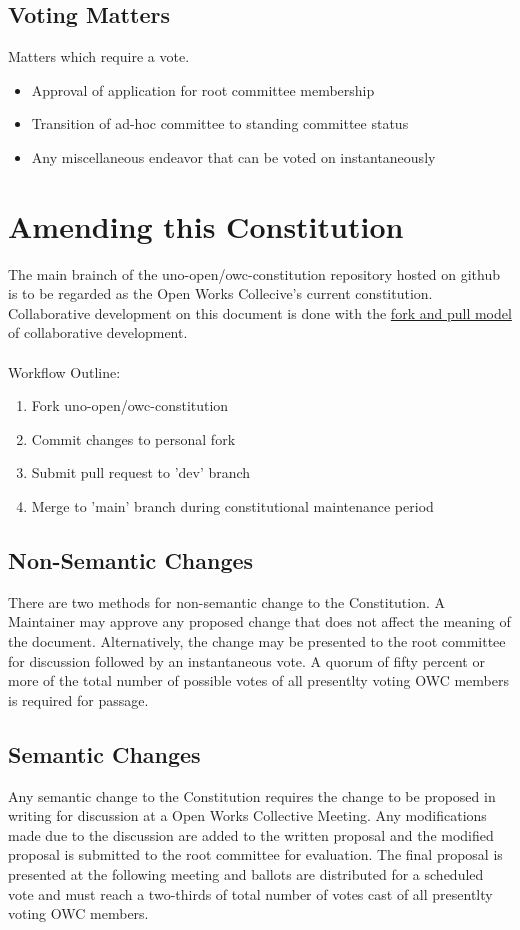 \documentclass{article}
\newcommand{\article}[1]{\section{#1} \label{#1}}
\newcommand{\asection}[1]{\subsection{#1} \label{#1}}
\begin{document}
\asection{Voting Matters}
Matters which require a vote.
\begin{itemize}
	\item Approval of application for root committee membership
	\item Transition of ad-hoc committee to standing committee status
	\item Any miscellaneous endeavor that can be voted on instantaneously
	
\end{itemize}

\article{Amending this Constitution}
The main brainch of the uno-open/owc-constitution repository hosted on github is to be regarded as the Open Works Collecive's current constitution.
Collaborative development on this document is done with the \href{https://docs.github.com/en/pull-requests/collaborating-with-pull-requests/getting-started/about-collaborative-development-models}{fork and pull model} of collaborative development. \\ \\
Workflow Outline:
\begin{enumerate}
    \item Fork uno-open/owc-constitution
    \item Commit changes to personal fork
    \item Submit pull request to 'dev' branch
    \item Merge to 'main' branch during constitutional maintenance period
\end{enumerate}

\asection{Non-Semantic Changes}
There are two methods for non-semantic change to the Constitution.
A Maintainer may approve any proposed change that does not affect the meaning of the document.
Alternatively, the change may be presented to the root committee for discussion followed by an instantaneous vote.
A quorum of fifty percent or more of the total number of possible votes of all presentlty voting OWC members is required for passage.

\asection{Semantic Changes}
Any semantic change to the Constitution requires the change to be proposed in writing for discussion at a Open Works Collective Meeting.
Any modifications made due to the discussion are added to the written proposal and the modified proposal is submitted to the root committee for evaluation.
The final proposal is presented at the following meeting and ballots are distributed for a scheduled vote and must reach a two-thirds of total number of votes cast of all presentlty voting OWC members.
\end{document}
